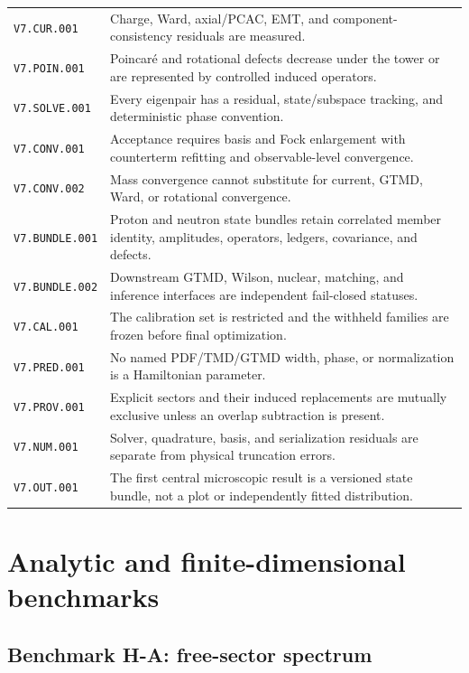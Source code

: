 \documentclass[11pt]{article}
\begin{document}
\begin{longtable}{L{0.16\textwidth}L{0.75\textwidth}}
\texttt{V7.CUR.001} & Charge, Ward, axial/PCAC, EMT, and component-consistency
residuals are measured.\\
\texttt{V7.POIN.001} & Poincar\'e and rotational defects decrease under the
tower or are represented by controlled induced operators.\\
\texttt{V7.SOLVE.001} & Every eigenpair has a residual, state/subspace tracking,
and deterministic phase convention.\\
\texttt{V7.CONV.001} & Acceptance requires basis and Fock enlargement with
counterterm refitting and observable-level convergence.\\
\texttt{V7.CONV.002} & Mass convergence cannot substitute for current, GTMD,
Ward, or rotational convergence.\\
\texttt{V7.BUNDLE.001} & Proton and neutron state bundles retain correlated
member identity, amplitudes, operators, ledgers, covariance, and defects.\\
\texttt{V7.BUNDLE.002} & Downstream GTMD, Wilson, nuclear, matching, and
inference interfaces are independent fail-closed statuses.\\
\texttt{V7.CAL.001} & The calibration set is restricted and the withheld
families are frozen before final optimization.\\
\texttt{V7.PRED.001} & No named PDF/TMD/GTMD width, phase, or normalization is a
Hamiltonian parameter.\\
\texttt{V7.PROV.001} & Explicit sectors and their induced replacements are
mutually exclusive unless an overlap subtraction is present.\\
\texttt{V7.NUM.001} & Solver, quadrature, basis, and serialization residuals are
separate from physical truncation errors.\\
\texttt{V7.OUT.001} & The first central microscopic result is a versioned state
bundle, not a plot or independently fitted distribution.\\
\bottomrule
\end{longtable}

\section{Analytic and finite-dimensional benchmarks}
\label{sec:benchmarks}

\subsection{Benchmark H-A: free-sector spectrum}
\end{document}
